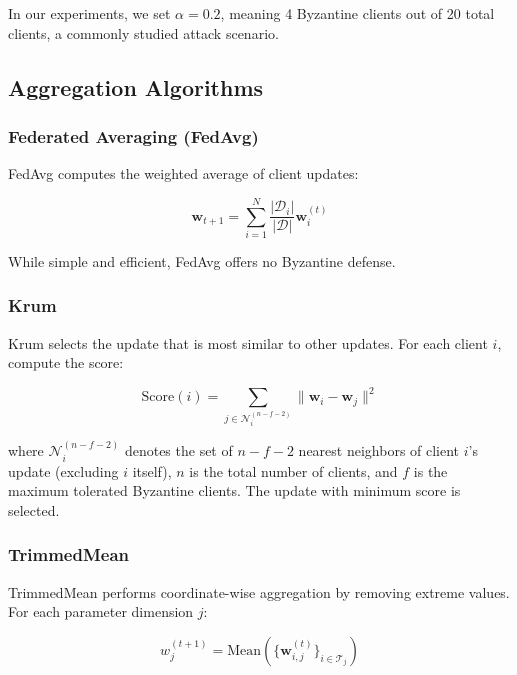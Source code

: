 \documentclass{ieeeaccess}
\begin{document}
In our experiments, we set $\alpha = 0.2$, meaning 4 Byzantine clients out of 20 total clients, a commonly studied attack scenario.

\subsection{Aggregation Algorithms}

\subsubsection{Federated Averaging (FedAvg)}

FedAvg computes the weighted average of client updates:

\begin{equation}
\mathbf{w}_{t+1} = \sum_{i=1}^{N} \frac{|\mathcal{D}_i|}{|\mathcal{D}|} \mathbf{w}_i^{(t)}
\label{eq:fedavg}
\end{equation}

While simple and efficient, FedAvg offers no Byzantine defense.

\subsubsection{Krum}

Krum selects the update that is most similar to other updates. For each client $i$, compute the score:

\begin{equation}
\text{Score}(i) = \sum_{j \in \mathcal{N}_i^{(n-f-2)}} \|\mathbf{w}_i - \mathbf{w}_j\|^2
\label{eq:krum_score}
\end{equation}

where $\mathcal{N}_i^{(n-f-2)}$ denotes the set of $n-f-2$ nearest neighbors of client $i$'s update (excluding $i$ itself), $n$ is the total number of clients, and $f$ is the maximum tolerated Byzantine clients. The update with minimum score is selected.

\subsubsection{TrimmedMean}

TrimmedMean performs coordinate-wise aggregation by removing extreme values. For each parameter dimension $j$:

\begin{equation}
w_j^{(t+1)} = \text{Mean}\left(\{\mathbf{w}_{i,j}^{(t)}\}_{i \in \mathcal{T}_j}\right)
\label{eq:trimmed_mean}
\end{equation}
\end{document}
